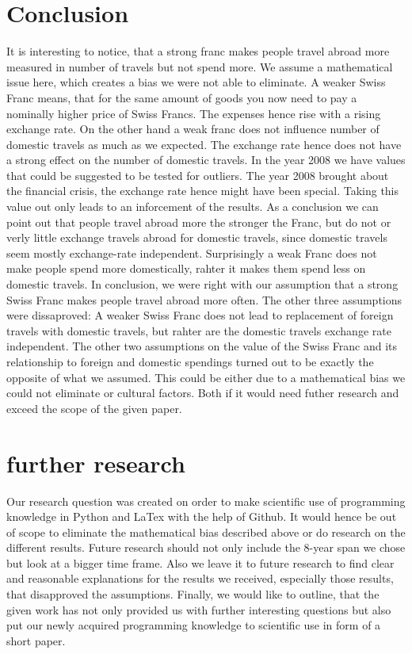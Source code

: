 \documentclass[12pt,a4paper,bibliography=totocnumbered,listof=totocnumbered]{scrartcl}
\begin{document}
\section{Conclusion}
It is interesting to notice, that a strong franc makes people travel abroad more measured in number of travels but not spend more. We assume a mathematical issue here, which creates a bias we were not able to eliminate. A weaker Swiss Franc means, that for the same amount of goods you now need to pay a nominally higher price of Swiss Francs. The expenses hence rise with a rising exchange rate. On the other hand a weak franc does not influence number of domestic travels as much as we expected. The exchange rate hence does not have a strong effect on the number of domestic travels. In the year 2008 we have values that could be suggested to be tested for outliers. The year 2008 brought about the financial crisis, the exchange rate hence might have been special. Taking this value out only leads to an inforcement of the results. As a conclusion we can point out that people travel abroad more the stronger the Franc, but do not or verly little exchange travels abroad for domestic travels, since domestic travels seem mostly exchange-rate independent. Surprisingly a weak Franc does not make people spend more domestically, rahter it makes them spend less on domestic travels. In conclusion, we were right with our assumption that a strong Swiss Franc makes people travel abroad more often. The other three assumptions were dissaproved: A weaker Swiss Franc does not lead to replacement of foreign travels with domestic travels, but rahter are the domestic travels exchange rate independent. The other two assumptions on the value of the Swiss Franc and its relationship to foreign and domestic spendings turned out to be exactly the opposite of what we assumed. This could be either due to a mathematical bias we could not eliminate or cultural factors. Both if it would need futher research and exceed the scope of the given paper.


\section{further research}
Our research question was created on order to make scientific use of programming knowledge in Python and LaTex with the help of Github. It would hence be out of scope to eliminate the mathematical bias described above or do research on the different results. Future research should not only include the 8-year span we chose but look at a bigger time frame. Also we leave it to future research to find clear and reasonable explanations for the results we received, especially those results, that disapproved the assumptions. Finally, we would like to outline, that the given work has not only provided us with further interesting questions but also put our newly acquired programming knowledge to scientific use in form of a short paper. 
\end{document}
